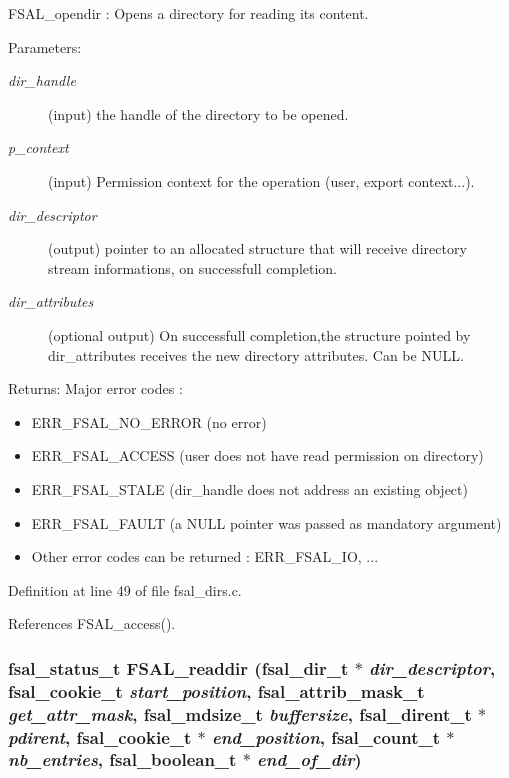 FSAL\_\-opendir : Opens a directory for reading its content.

\begin{Desc}
\item[Parameters:]
\begin{description}
\item[{\em dir\_\-handle}](input) the handle of the directory to be opened. \item[{\em p\_\-context}](input) Permission context for the operation (user, export context...). \item[{\em dir\_\-descriptor}](output) pointer to an allocated structure that will receive directory stream informations, on successfull completion. \item[{\em dir\_\-attributes}](optional output) On successfull completion,the structure pointed by dir\_\-attributes receives the new directory attributes. Can be NULL.\end{description}
\end{Desc}
\begin{Desc}
\item[Returns:]Major error codes :\begin{itemize}
\item ERR\_\-FSAL\_\-NO\_\-ERROR (no error)\item ERR\_\-FSAL\_\-ACCESS (user does not have read permission on directory)\item ERR\_\-FSAL\_\-STALE (dir\_\-handle does not address an existing object)\item ERR\_\-FSAL\_\-FAULT (a NULL pointer was passed as mandatory argument)\item Other error codes can be returned : ERR\_\-FSAL\_\-IO, ... \end{itemize}
\end{Desc}


Definition at line 49 of file fsal\_\-dirs.c.

References FSAL\_\-access().
\subsubsection{\setlength{\rightskip}{0pt plus 5cm}fsal\_\-status\_\-t FSAL\_\-readdir (fsal\_\-dir\_\-t $\ast$ {\em dir\_\-descriptor}, fsal\_\-cookie\_\-t {\em start\_\-position}, fsal\_\-attrib\_\-mask\_\-t {\em get\_\-attr\_\-mask}, fsal\_\-mdsize\_\-t {\em buffersize}, fsal\_\-dirent\_\-t $\ast$ {\em pdirent}, fsal\_\-cookie\_\-t $\ast$ {\em end\_\-position}, fsal\_\-count\_\-t $\ast$ {\em nb\_\-entries}, fsal\_\-boolean\_\-t $\ast$ {\em end\_\-of\_\-dir})}\label{fsal__dirs_8c_a1}



